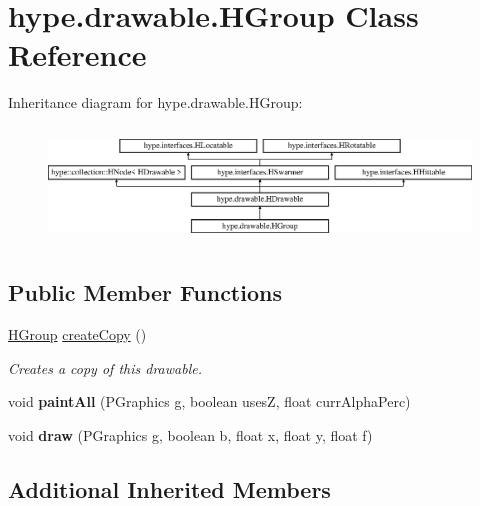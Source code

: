 \hypertarget{classhype_1_1drawable_1_1_h_group}{\section{hype.\-drawable.\-H\-Group Class Reference}
\label{classhype_1_1drawable_1_1_h_group}
}
Inheritance diagram for hype.\-drawable.\-H\-Group\-:\begin{figure}[H]
\begin{center}
\leavevmode
\includegraphics[height=3.111111cm]{classhype_1_1drawable_1_1_h_group}
\end{center}
\end{figure}
\subsection*{Public Member Functions}
\begin{DoxyCompactItemize}
\item 
\hyperlink{classhype_1_1drawable_1_1_h_group}{H\-Group} \hyperlink{classhype_1_1drawable_1_1_h_group_a95a20a6436c9d906c966d21f3faf8959}{create\-Copy} ()
\begin{DoxyCompactList}\small\item\em Creates a copy of this drawable. \end{DoxyCompactList}\item 
\hypertarget{classhype_1_1drawable_1_1_h_group_a496c3e9fdd6f0970c6dfa3ddcde363d4}{void {\bfseries paint\-All} (P\-Graphics g, boolean uses\-Z, float curr\-Alpha\-Perc)}\label{classhype_1_1drawable_1_1_h_group_a496c3e9fdd6f0970c6dfa3ddcde363d4}

\item 
\hypertarget{classhype_1_1drawable_1_1_h_group_a561903c282e77c3e43ab0f7d9e3e4ff2}{void {\bfseries draw} (P\-Graphics g, boolean b, float x, float y, float f)}\label{classhype_1_1drawable_1_1_h_group_a561903c282e77c3e43ab0f7d9e3e4ff2}

\end{DoxyCompactItemize}
\subsection*{Additional Inherited Members}


